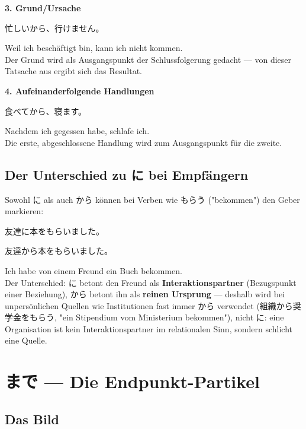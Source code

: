\documentclass[12pt]{book}
\begin{document}
\textbf{3. Grund/Ursache}
\par\quad 忙しいから、行けません。\\
\par\quad Weil ich beschäftigt bin, kann ich nicht kommen.\\

Der Grund wird als Ausgangspunkt der Schlussfolgerung gedacht — von dieser Tatsache aus ergibt sich das Resultat.

\textbf{4. Aufeinanderfolgende Handlungen}
\par\quad 食べてから、寝ます。\\
\par\quad Nachdem ich gegessen habe, schlafe ich.\\

Die erste, abgeschlossene Handlung wird zum Ausgangspunkt für die zweite.

\section*{Der Unterschied zu に bei Empfängern}

Sowohl に als auch から können bei Verben wie もらう ("bekommen") den Geber markieren:

\par\quad 友達に本をもらいました。\\
\par\quad 友達から本をもらいました。\\
\par\quad Ich habe von einem Freund ein Buch bekommen.\\

Der Unterschied: に betont den Freund als \textbf{Interaktionspartner} (Bezugspunkt einer Beziehung), から betont ihn als \textbf{reinen Ursprung} — deshalb wird bei unpersönlichen Quellen wie Institutionen fast immer から verwendet (組織から奨学金をもらう, "ein Stipendium vom Ministerium bekommen"), nicht に: eine Organisation ist kein Interaktionspartner im relationalen Sinn, sondern schlicht eine Quelle.


\chapter{まで — Die Endpunkt-Partikel}

\section*{Das Bild}
\end{document}
